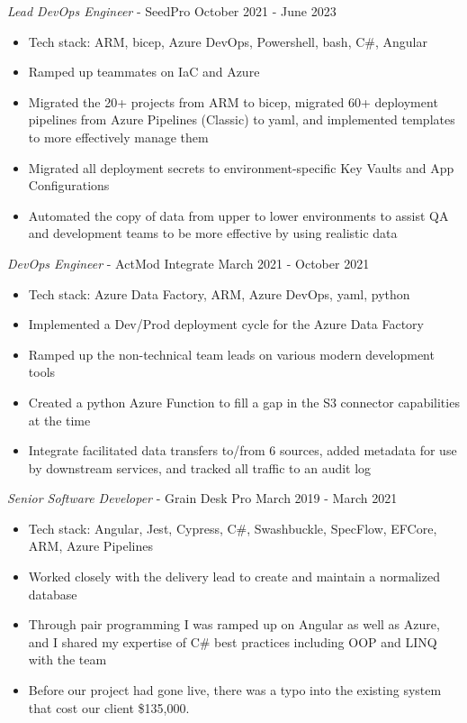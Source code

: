 \documentclass[line,margin]{res}
\begin{document}
\begin{resume}
\begin{itemize}
	\end{itemize} 
	{\sl Lead DevOps Engineer} - SeedPro \hfill October 2021 - June 2023 
	\begin{itemize}
		\item Tech stack: ARM, bicep, Azure DevOps, Powershell, bash, C\#, Angular
		\item Ramped up teammates on IaC and Azure
		\item Migrated the 20+ projects from ARM to bicep, 
			migrated 60+ deployment pipelines from Azure Pipelines (Classic) to yaml, 
			and implemented templates to more effectively manage them
		\item Migrated all deployment secrets to environment-specific Key Vaults and App Configurations
		\item Automated the copy of data from upper to lower environments to assist QA and development teams to be more effective by using realistic data
	\end{itemize} 
	{\sl DevOps Engineer} - ActMod Integrate \hfill March 2021 - October 2021
	\begin{itemize}
		\item Tech stack: Azure Data Factory, ARM, Azure DevOps, yaml, python
		\item Implemented a Dev/Prod deployment cycle for the Azure Data Factory
		\item Ramped up the non-technical team leads on various modern development tools
		\item Created a python Azure Function to fill a gap in the S3 connector capabilities at the time
		\item Integrate facilitated data transfers to/from 6 sources, added metadata for use by downstream services, 
			and tracked all traffic to an audit log
	\end{itemize}
	{\sl Senior Software Developer} - Grain Desk Pro \hfill March 2019 - March 2021
	\begin{itemize}
		\item Tech stack: Angular, Jest, Cypress, C\#, Swashbuckle, SpecFlow, EFCore, ARM, Azure Pipelines
		\item Worked closely with the delivery lead to create and maintain a normalized database
		\item Through pair programming I was ramped up on Angular as well as Azure, 
			and I shared my expertise of C\# best practices including OOP and LINQ with the team
		\item Before our project had gone live, there was a typo into the existing system that cost our client \$135,000. 

\end{itemize}
\end{resume}
\end{document}
